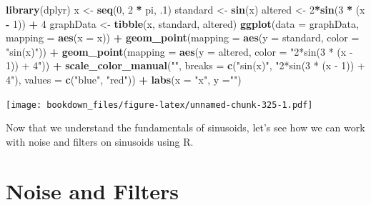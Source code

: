 \documentclass[
]{krantz}
\makeatletter
\newenvironment{Shaded}{\begin{snugshade}}{\end{snugshade}}
\newcommand{\DataTypeTok}[1]{\textcolor[rgb]{0.27,0.27,0.27}{#1}}
\newcommand{\DecValTok}[1]{\textcolor[rgb]{0.06,0.06,0.06}{#1}}
\newcommand{\FloatTok}[1]{\textcolor[rgb]{0.06,0.06,0.06}{#1}}
\newcommand{\KeywordTok}[1]{\textcolor[rgb]{0.27,0.27,0.27}{\textbf{#1}}}
\newcommand{\NormalTok}[1]{#1}
\newcommand{\OperatorTok}[1]{\textcolor[rgb]{0.43,0.43,0.43}{\textbf{#1}}}
\newcommand{\StringTok}[1]{\textcolor[rgb]{0.5,0.5,0.5}{#1}}
\newenvironment{kframe}{%
\medskip{}
\setlength{\fboxsep}{.8em}
 \def\at@end@of@kframe{}%
 \ifinner\ifhmode%
  \def\at@end@of@kframe{\end{minipage}}%
  \begin{minipage}{\columnwidth}%
 \fi\fi%
 \def\FrameCommand##1{\hskip\@totalleftmargin \hskip-\fboxsep
 \colorbox{shadecolor}{##1}\hskip-\fboxsep
     \hskip-\linewidth \hskip-\@totalleftmargin \hskip\columnwidth}%
 \MakeFramed {\advance\hsize-\width
   \@totalleftmargin\z@ \linewidth\hsize
   \@setminipage}}%
 {\par\unskip\endMakeFramed%
 \at@end@of@kframe}
\renewenvironment{Shaded}{\begin{kframe}}{\end{kframe}}
\makeatother
\begin{document}
\begin{Shaded}
\begin{Highlighting}[]
\KeywordTok{library}\NormalTok{(dplyr)}
\NormalTok{x \textless{}{-}}\StringTok{ }\KeywordTok{seq}\NormalTok{(}\DecValTok{0}\NormalTok{, }\DecValTok{2} \OperatorTok{*}\StringTok{ }\NormalTok{pi, }\FloatTok{.1}\NormalTok{)}
\NormalTok{standard \textless{}{-}}\StringTok{ }\KeywordTok{sin}\NormalTok{(x)}
\NormalTok{altered \textless{}{-}}\StringTok{ }\DecValTok{2}\OperatorTok{*}\KeywordTok{sin}\NormalTok{(}\DecValTok{3} \OperatorTok{*}\StringTok{ }\NormalTok{(x }\OperatorTok{{-}}\StringTok{ }\DecValTok{1}\NormalTok{)) }\OperatorTok{+}\StringTok{ }\DecValTok{4}
\NormalTok{graphData \textless{}{-}}\StringTok{ }\KeywordTok{tibble}\NormalTok{(x, standard, altered)}
\KeywordTok{ggplot}\NormalTok{(}\DataTypeTok{data =}\NormalTok{ graphData, }\DataTypeTok{mapping =} \KeywordTok{aes}\NormalTok{(}\DataTypeTok{x =}\NormalTok{ x)) }\OperatorTok{+}\StringTok{ }
\StringTok{  }\KeywordTok{geom\_point}\NormalTok{(}\DataTypeTok{mapping =} \KeywordTok{aes}\NormalTok{(}\DataTypeTok{y =}\NormalTok{ standard, }\DataTypeTok{color =} \StringTok{"sin(x)"}\NormalTok{)) }\OperatorTok{+}\StringTok{ }
\StringTok{  }\KeywordTok{geom\_point}\NormalTok{(}\DataTypeTok{mapping =} \KeywordTok{aes}\NormalTok{(}\DataTypeTok{y =}\NormalTok{ altered, }\DataTypeTok{color =} \StringTok{"2*sin(3 * (x {-} 1)) + 4"}\NormalTok{)) }\OperatorTok{+}\StringTok{ }
\StringTok{  }\KeywordTok{scale\_color\_manual}\NormalTok{(}\StringTok{""}\NormalTok{, }\DataTypeTok{breaks =} \KeywordTok{c}\NormalTok{(}\StringTok{"sin(x)"}\NormalTok{, }\StringTok{"2*sin(3 * (x {-} 1)) + 4"}\NormalTok{), }
                     \DataTypeTok{values =} \KeywordTok{c}\NormalTok{(}\StringTok{"blue"}\NormalTok{, }\StringTok{"red"}\NormalTok{)) }\OperatorTok{+}\StringTok{ }
\StringTok{  }\KeywordTok{labs}\NormalTok{(}\DataTypeTok{x =} \StringTok{"x"}\NormalTok{, }\DataTypeTok{y =}\StringTok{""}\NormalTok{)}
\end{Highlighting}
\end{Shaded}

\texttt{[image: bookdown\_files/figure-latex/unnamed-chunk-325-1.pdf]}

Now that we understand the fundamentals of sinusoids, let's see how we can work with noise and filters on sinusoids using R.

\hypertarget{noise-and-filters}{%
\section{Noise and Filters}\label{noise-and-filters}}
\end{document}
